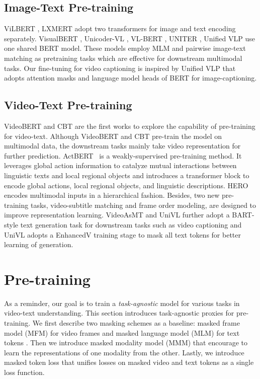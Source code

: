 \documentclass[11pt,a4paper]{article}
\begin{document}
\subsection{Image-Text Pre-training}
ViLBERT \cite{lu2019vilbert}, LXMERT \cite{tan-bansal-2019-lxmert} adopt two transformers for image and text encoding separately. 
VisualBERT \cite{li2019visualbert}, Unicoder-VL \cite{li2020unicoder}, VL-BERT \cite{Su2020VL-BERT:}, UNITER \cite{chen2020uniter}, Unified VLP \cite{zhou2020unified} use one shared BERT model.
These models employ MLM and pairwise image-text matching as pretraining tasks which are effective for downstream multimodal tasks.
Our fine-tuning for video captioning is inspired by Unified VLP \cite{zhou2020unified} that adopts attention masks and language model heads of BERT for image-captioning.

\subsection{Video-Text Pre-training}
VideoBERT \cite{sun2019videobert} and CBT \cite{sun2019contrastive} are the first works to explore the capability of pre-training for video-text. 
Although VideoBERT and CBT pre-train the model on multimodal data, the downstream tasks mainly take video representation for further prediction. 
ActBERT~\cite{zhu2020actbert} is a weakly-supervised pre-training method.
It leverages global action information to catalyze mutual interactions between linguistic texts and local regional objects and introduces a transformer block to encode global actions, local regional objects, and linguistic descriptions.
HERO \cite{li-etal-2020-hero} encodes multimodal inputs in a hierarchical fashion. Besides, two new pre-training tasks, video-subtitle matching and frame order modeling, are designed to improve representation learning. 
VideoAsMT \cite{korbar2020video} and UniVL \cite{luo2020univilm} further adopt a BART-style\cite{lewis-etal-2020-bart} text generation task for downstream tasks such as video captioning and UniVL adopts a EnhancedV training stage to mask all text tokens for better learning of generation. 

\section{Pre-training}
\label{sec:pretrain}

As a reminder, our goal is to train a  \textit{task-agnostic} model for various tasks in video-text understanding. 
This section introduces task-agnostic proxies for pre-training. We first describe two masking schemes as a baseline: 
masked frame model (MFM) for video frames and masked language model (MLM) for text tokens \cite{sun2019contrastive,li-etal-2020-hero,luo2020univilm}. 
Then we
introduce masked modality model (MMM) that encourage to  learn the representations of one modality from the other.
Lastly, we introduce masked token loss that 
unifies losses on masked video and text tokens
as a single loss function.
\end{document}
